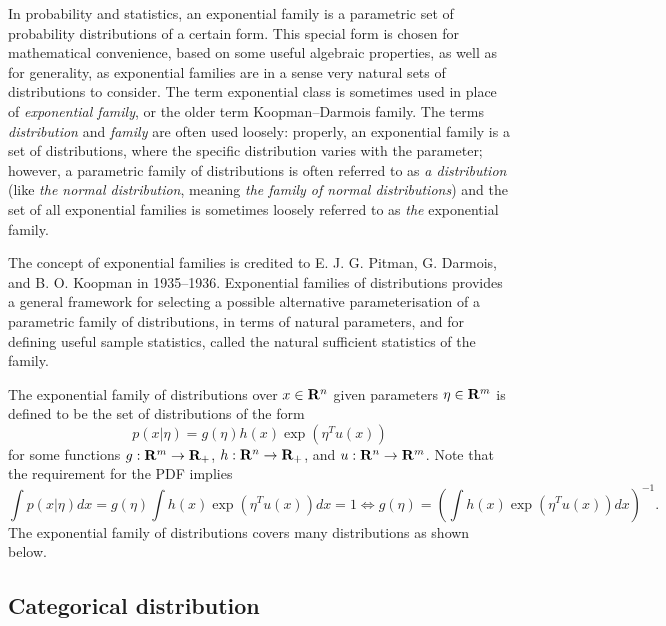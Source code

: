 In probability and statistics,
an exponential family is a parametric set of probability distributions of a certain form.
This special form is chosen for mathematical convenience, based on some useful algebraic properties,
as well as for generality,
as exponential families are in a sense very natural sets of distributions to consider.
The term exponential class is sometimes used in place of \emph{exponential family},
or the older term Koopman–Darmois family.
The terms \emph{distribution} and \emph{family} are often used loosely:
properly, an exponential family is a set of distributions,
where the specific distribution varies with the parameter;
however, a parametric family of distributions is often referred to as \emph{a distribution}
(like \emph{the normal distribution}, meaning \emph{the family of normal distributions})
and the set of all exponential families is sometimes loosely referred to as \emph{the} exponential family.

The concept of exponential families is credited to E. J. G. Pitman, G. Darmois, and B. O. Koopman in 1935–1936.
Exponential families of distributions provides a general framework for selecting a possible alternative parameterisation of a parametric family of distributions,
in terms of natural parameters, and for defining useful sample statistics, called the natural sufficient statistics of the family.

The exponential family of distributions over $x\in\mathbf{R}^n$ given parameters $\eta \in\mathbf{R}^m$ is defined to be the set of distributions of the form
\begin{equation}
\label{eq:pdf:exp-family}
p(x|\eta) = g(\eta) h(x) \exp(\eta^T u(x))
\end{equation}
for some functions $g:\mathbf{R}^m \to {\mathbf{R}_+}$, $h:\mathbf{R}^n\to{\mathbf{R}_+}$,
and $u:\mathbf{R}^n \to \mathbf{R}^m$.
Note that the requirement for the PDF implies
\begin{equation}
\label{eq:vbydiuv}
\int p(x|\eta) dx = g(\eta) \int h(x) \exp(\eta^T u(x)) dx = 1
\Leftrightarrow
g(\eta) = \left(\int h(x) \exp(\eta^T u(x)) dx \right)^{-1}.
\end{equation}
The exponential family of distributions covers many distributions as shown below.

\subsection{Categorical distribution}

